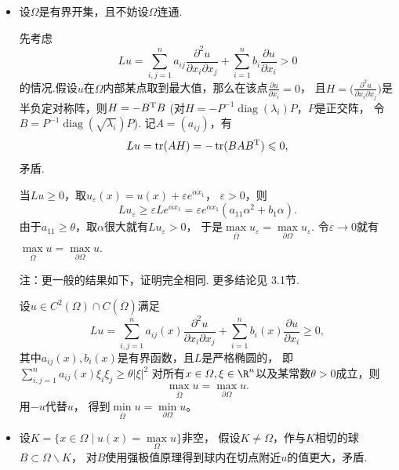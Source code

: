 \begin{itemize}
    \item[1.]
    设$\varOmega$是有界开集，且不妨设$\varOmega$连通.

    先考虑
    \[Lu=\sum_{i,j=1}^na_{ij}\frac{\partial^2u}{\partial x_i\partial x_j}
    +\sum_{i=1}^nb_i\frac{\partial u}{\partial x_i}>0\]
    的情况.假设$u$在$\varOmega$内部某点取到最大值，那么在该点$\frac{\partial u}{\partial x_i}=0$，
    且$H=\big(\frac{\partial^2u}{\partial x_i\partial x_j}\big)$是半负定对称阵，则$H=-B^{\rm T}B$
    (对$H=-P^{-1}\operatorname{diag}(\lambda_i)P$，$P$是正交阵，
    令$B=P^{-1}\operatorname{diag}(\sqrt{\lambda_i})P$).
    记$A=(a_{ij})$，有
    \[Lu=\operatorname{tr}(AH)=-\operatorname{tr}(BAB^{\rm T})\leqslant0,\]
    矛盾.

    当$Lu\geqslant0$，取$u_\varepsilon(x)=u(x)+\varepsilon e^{\alpha x_1}$，
    $\varepsilon>0$，则
    \[Lu_\varepsilon\geqslant\varepsilon Le^{\alpha x_1}
    =\varepsilon e^{\alpha x_1}(a_{11}\alpha^2+b_1\alpha).\]
    由于$a_{11}\geqslant\theta$，取$\alpha$很大就有$Lu_\varepsilon>0$，
    于是$\max\limits_{\overline{\varOmega}}u_\varepsilon
    =\max\limits_{\partial\varOmega}u_\varepsilon$.
    令$\varepsilon\rightarrow0$就有$\max\limits_{\overline{\varOmega}}u
    =\max\limits_{\partial\varOmega}u$.

    注：更一般的结果如下，证明完全相同. 更多结论见\cite{GT} 3.1节.
    \begin{proposition1}
        设$u\in C^2(\varOmega)\cap C(\overline{\varOmega})$满足
        $$Lu=\sum_{i,j=1}^na_{ij}(x)\frac{\partial^2u}{\partial x_i\partial x_j}
        +\sum_{i=1}^nb_i(x)\frac{\partial u}{\partial x_i}\geqslant0,$$
        其中$a_{ij}(x),b_i(x)$是有界函数，且$L$是严格椭圆的，
        即$\sum\limits_{i,j=1}^na_{ij}(x)\xi_i\xi_j\geqslant\theta|\xi|^2$
        对所有$x\in\varOmega,\xi\in\R^n$以及某常数$\theta>0$成立，则
        $$\max_{\overline{\varOmega}}u=\max_{\partial\varOmega}u.$$
        用$-u$代替$u$，
        得到$\min\limits_{\overline{\varOmega}}u=\min\limits_{\partial\varOmega}u$。
    \end{proposition1}

    \item[2.]
    设$K=\{x\in\varOmega\mid u(x)=\max\limits_{\varOmega}u\}$非空，
    假设$K\neq\varOmega$，作与$K$相切的球$B\subset\varOmega\backslash K$，
    对$B$使用强极值原理得到球内在切点附近$u$的值更大，矛盾.


\end{itemize}
